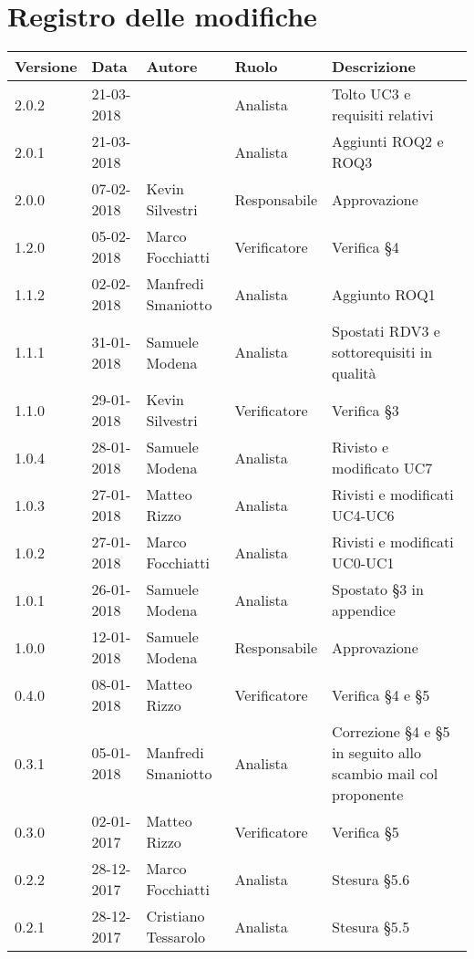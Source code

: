 \documentclass[./AnalisideiRequisiti.tex]{subfiles}
\begin{document}
	
{
	\chapter*{Registro delle modifiche}
\setlength\LTleft{-22mm}
	\begin{longtable}{|p{20mm}|p{20mm}|p{40mm}|p{30mm}|p{50mm}|}
		\hline
		\textbf{Versione} & \textbf{Data} & \textbf{Autore} & \textbf{Ruolo} & \textbf{Descrizione} \\ \hline 
		    
		2.0.2 & 21-03-2018 &  & Analista & Tolto UC3 e requisiti relativi\\ \hline
		2.0.1 & 21-03-2018 &  & Analista & Aggiunti ROQ2 e ROQ3\\ \hline
		2.0.0 & 07-02-2018 & Kevin Silvestri & Responsabile & Approvazione\\ \hline 
		1.2.0 & 05-02-2018 & Marco Focchiatti & Verificatore & Verifica §4\\ \hline    
		1.1.2 & 02-02-2018 & Manfredi Smaniotto & Analista & Aggiunto ROQ1\\ \hline 
		1.1.1 & 31-01-2018 & Samuele Modena & Analista & Spostati RDV3 e sottorequisiti in qualità\\ \hline  
		1.1.0 & 29-01-2018 & Kevin Silvestri & Verificatore & Verifica §3\\ \hline  
		1.0.4 & 28-01-2018 & Samuele Modena & Analista & Rivisto e modificato UC7\\ \hline  
		1.0.3 & 27-01-2018 & Matteo Rizzo & Analista & Rivisti e modificati UC4-UC6\\ \hline    
		1.0.2 & 27-01-2018 & Marco Focchiatti & Analista & Rivisti e modificati UC0-UC1\\ \hline  
		1.0.1 & 26-01-2018 & Samuele Modena & Analista & Spostato §3 in appendice\\ \hline
		1.0.0 & 12-01-2018 & Samuele Modena & Responsabile & Approvazione\\ \hline
		0.4.0 & 08-01-2018 & Matteo Rizzo & Verificatore & Verifica §4 e §5\\ \hline
		0.3.1 & 05-01-2018 & Manfredi Smaniotto & Analista & Correzione §4 e §5 in seguito allo scambio mail col proponente \\ \hline		
		0.3.0 & 02-01-2017 & Matteo Rizzo & Verificatore & Verifica §5\\ \hline
		0.2.2 & 28-12-2017 & Marco Focchiatti & Analista & Stesura §5.6\\ \hline	
		0.2.1 & 28-12-2017 & Cristiano Tessarolo & Analista & Stesura §5.5\\ \hline

\end{longtable}}
\end{document}
